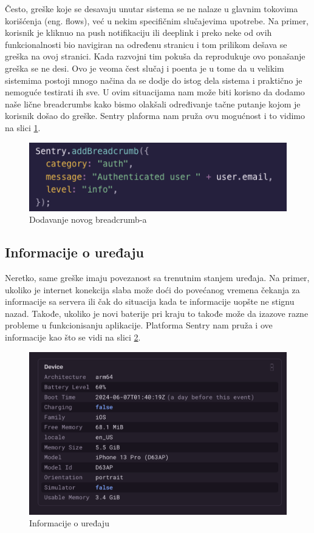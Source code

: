 \documentclass[12pt,oneside]{memoir}
\begin{document}
Često, greške koje se desavaju unutar sistema se ne nalaze u glavnim tokovima korišćenja (eng. flows), već u nekim specifičnim slučajevima upotrebe. Na primer, korisnik je kliknuo na push notifikaciju ili deeplink\cite[133 - 139]{reactNative} i preko neke od ovih funkcionalnosti bio navigiran na određenu stranicu i tom prilikom dešava se greška na ovoj stranici. Kada razvojni tim pokuša da reprodukuje ovo ponašanje greška se ne desi. Ovo je veoma čest slučaj i poenta je u tome da u velikim sistemima postoji mnogo načina da se dodje do istog dela sistema i praktično je nemoguće testirati ih sve. U ovim situacijama nam može biti korisno da dodamo naše lične breadcrumbs kako bismo olakšali određivanje tačne putanje kojom je korisnik došao do greške. Sentry plaforma nam pruža ovu mogućnost i to vidimo na slici \ref{fig:addBreadcrumb}.

\begin{figure}[h!]
\centering
\includegraphics[scale=0.8]{docs/images/chapterSeven/addBreadcrumb.png}
\caption{Dodavanje novog breadcrumb-a}
\label{fig:addBreadcrumb}
\end{figure}

\subsection{Informacije o uređaju}

Neretko, same greške imaju povezanost sa trenutnim stanjem uređaja. Na primer, ukoliko je internet konekcija slaba može doći do povećanog vremena čekanja za informacije sa servera ili čak do situacija kada te informacije uopšte ne stignu nazad. Takođe, ukoliko je novi baterije pri kraju to takođe može da izazove razne probleme u funkcionisanju aplikacije. Platforma Sentry nam pruža i ove informacije kao što se vidi na slici \ref{fig:deviceInfo}.

\begin{figure}[h!]
\centering
\includegraphics[scale=0.8]{docs/images/chapterSeven/deviceInfo.png}
\caption{Informacije o uređaju}
\label{fig:deviceInfo}
\end{figure}
\end{document}
